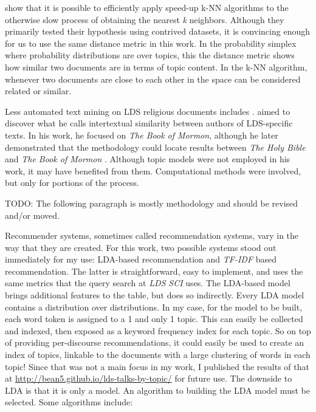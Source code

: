 \cite{Krstovski2013efficient} %
show that it is possible to efficiently apply speed-up k-NN algorithms to the otherwise slow process of obtaining the nearest \emph{k} neighbors. Although they primarily tested their hypothesis using contrived datasets, it is convincing enough for us to use the same distance metric in this work. In the probability simplex where probability distributions are over topics, this the distance metric shows how similar two documents are in terms of topic content. In the k-NN algorithm, whenever two documents are close to each other in the space can be considered related or similar.

Less automated text mining on LDS religious documents includes \citep{hilton:2008:abinadi} %
. \citeauthor{hilton:2008:abinadi} aimed to discover what he calls intertextual similarity between authors of LDS-specific texts. In his work, he focused on \emph{The Book of Mormon}, although he later demonstrated that the methodology could locate results between \emph{The Holy Bible} and \emph{The Book of Mormon} \citep{hilton:2013:psalms}. Although topic models were not employed in his work, it may have benefited from them. Computational methods were involved, but only for portions of the process.

TODO: The following paragraph is mostly methodology and should be revised and/or moved.

Recommender systems, sometimes called recommendation systems, vary in the way that they are created. For this work, two possible systems stood out immediately for my use: LDA-based recommendation and \emph{TF-IDF} based recommendation. The latter is straightforward, easy to implement, and uses the same metrics that the query search at \emph{LDS SCI} uses. The LDA-based model brings additional features to the table, but does so indirectly. Every LDA model contains a distribution over distributions. In my case, for the model to be built, each word token is assigned to a 1 and only 1 topic. This can easily be collected and indexed, then exposed as a keyword frequency index for each topic. So on top of providing per-discourse recommendations, it could easily be used to create an index of topics, linkable to the documents with a large clustering of words in each topic! Since that was not a main focus in my work, I published the results of that at \url{http://bean5.github.io/lds-talks-by-topic/} for future use. The downside to LDA is that it is only a model. An algorithm to building the LDA model must be selected. Some algorithms include:

